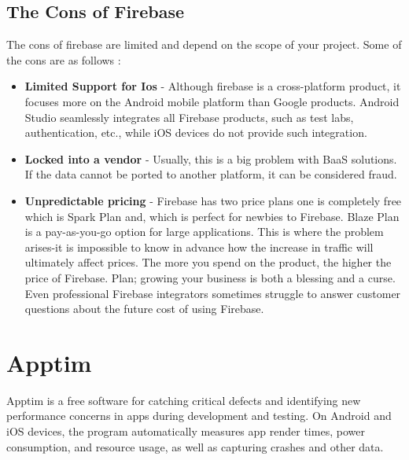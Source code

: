 \subsection{The Cons of Firebase}
The cons of firebase are limited and depend on the scope of your project. Some of the cons are as follows \cite{Downsidefirebase:online}:
\begin{itemize}
    \item \textbf{Limited Support for Ios} - Although firebase is a cross-platform product, it focuses more on the Android mobile platform than Google products. Android Studio seamlessly integrates all Firebase products, such as test labs, authentication, etc., while iOS devices do not provide such integration.
    \item \textbf{Locked into a vendor} - Usually, this is a big problem with BaaS solutions. If the data cannot be ported to another platform, it can be considered fraud.
    \item \textbf{Unpredictable pricing} - Firebase has two price plans one is completely free which is Spark Plan and, which is perfect for newbies to Firebase. Blaze Plan is a pay-as-you-go option for large applications. This is where the problem arises-it is impossible to know in advance how the increase in traffic will ultimately affect prices. The more you spend on the product, the higher the price of Firebase. Plan; growing your business is both a blessing and a curse. Even professional Firebase integrators sometimes struggle to answer customer questions about the future cost of using Firebase.
\end{itemize}

\section{Apptim}
Apptim is a free software for catching critical defects and identifying new performance concerns in apps during development and testing. On Android and iOS devices, the program automatically measures app render times, power consumption, and resource usage, as well as capturing crashes and other data.
